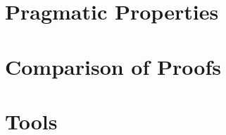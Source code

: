 \documentclass{llncs}
\begin{document}



\section{Pragmatic Properties}







\section{Comparison of Proofs}




\section{Tools}




\end{document}
